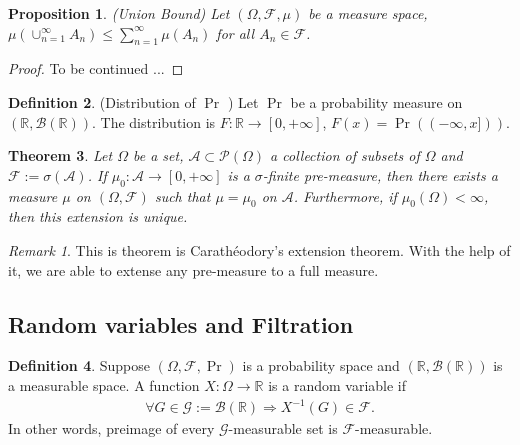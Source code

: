 \documentclass[a4paper,11pt]{report}
\theoremstyle{plain} %
\newtheorem{thm}{Theorem}[section]
\newtheorem{prop}[thm]{Proposition}
\theoremstyle{definition} %
\newtheorem{defn}[thm]{Definition}
\theoremstyle{remark} %
\newtheorem*{rem}{Remark}
\begin{document}
\begin{prop}(Union Bound)  Let $(\Omega, \mathcal{F},\mu)$ be a measure space, $\mu (\cup_{n=1}^{\infty}  A_{n} ) \leq \sum_{n=1}^{\infty} \mu (A_{n})$ for all $A_{n} \in \mathcal{F}$.
\end{prop}

\begin{proof}
To be continued ...
\end{proof}

\begin{defn}(Distribution of $\Pr$ ) Let $\Pr$ be a probability measure on $(\mathbb{R}, \mathcal{B}(\mathbb{R}))$. The distribution is $F:\mathbb{R}\rightarrow [0,+\infty]$, $F(x)= \Pr ((-\infty, x]))$.

\end{defn}

\begin{thm}
Let $\Omega$ be a set, $\mathcal{A}\subset \mathcal{P}(\Omega)$ a collection of subsets of $\Omega$ and $\mathcal{F}:= \sigma (\mathcal{A})$. If $\mu_{0}:\mathcal{A}\rightarrow [0,+\infty ]$ is a $\sigma$-finite pre-measure, then there exists a measure $\mu$ on $(\Omega, \mathcal{F})$ such that $\mu = \mu_{0}$ on $\mathcal{A}$. Furthermore, if $\mu_{0}(\Omega)< \infty$, then this extension is unique.
\end{thm}

\begin{rem}This is theorem is Carath\'eodory's extension theorem. With the help of it, we are able to extense any pre-measure to a full measure.

\end{rem}

\subsection{Random variables and Filtration}
\begin{defn} Suppose $(\Omega, \mathcal{F},\Pr)$ is a probability space and $(\mathbb{R}, \mathcal{B}(\mathbb{R}))$ is a measurable space. A function $X:\Omega \rightarrow \mathbb{R}$ is a random variable if 
\begin{align*}
    \forall G \in \mathcal{G}:= \mathcal{B}(\mathbb{R}) \Rightarrow X^{-1}(G) \in \mathcal{F}.
\end{align*}
In other words, preimage of every $\mathcal{G}$-measurable set is $\mathcal{F}$-measurable.
\end{defn}
\end{document}
